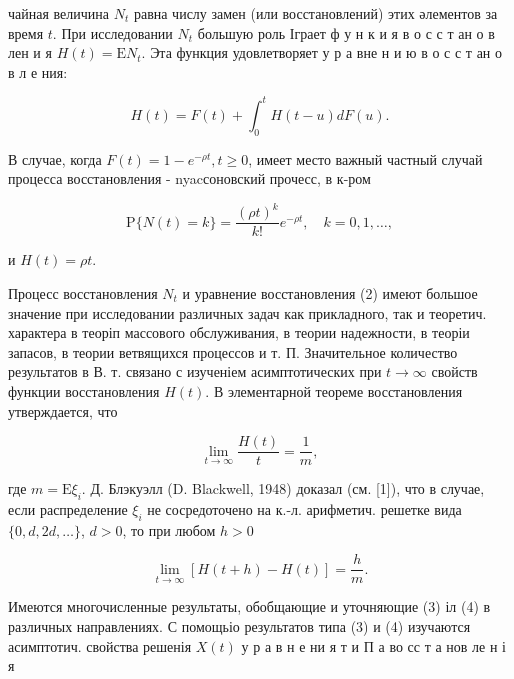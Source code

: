 \documentclass[10pt]{article}
\begin{document}
чайная величина $N_{t}$ равна числу замен (или восстановлений) этих әлементов за время $t$. При исследовании $N_{t}$ большую роль Іграет ф у н к и я в о с с т ан о в лен и я $H(t)=\mathrm{E} N_{t}$. Эта функция удовлетворяет у р а вне н и ю в о с с т ан о в л е ния:



\[

H(t)=F(t)+\int_{0}^{t} H(t-u) d F(u) .

\]



В случае, когда $F(t)=1-e^{-\rho t}, t \geqslant 0$, имеет место важный частный случай процесса восстановления - nyacсоновский прочесс, в к-ром



\[

\mathrm{P}\{N(t)=k\}=\frac{(\rho t)^{k}}{k !} e^{-\rho t}, \quad k=0,1, \ldots,

\]



и $H(t)=\rho t$.



Процесс восстановления $N_{t}$ и уравнение восстановления (2) имеют большое значение при исследовании различных задач как прикладного, так и теоретич. характера в теоріп массового обслуживания, в теории надежности, в теоріи запасов, в теории ветвящихся процессов и т. П. Значительное количество результатов в В. т. связано с изученіем асимптотических при $t \rightarrow \infty$ свойств функции восстановления $H(t)$. В элементарной теореме восстановления утверждается, что



\[

\lim _{t \rightarrow \infty} \frac{H(t)}{t}=\frac{1}{m},

\]



где $m=\mathrm{E} \xi_{i}$. Д. Блэкуэлл (D. Blackwell, 1948) доказал (см. [1]), что в случае, если распределение $\xi_{i}$ не сосредоточено на к.-л. арифметич. решетке вида $\{0, d, 2 d, \ldots\}$, $d>0$, то при любом $h>0$



\[

\lim _{t \rightarrow \infty}[H(t+h)-H(t)]=\frac{h}{m} .

\]



Имеются многочисленные результаты, обобщающие и уточняющие (3) іл (4) в различных направлениях. С помощьіо результатов типа (3) и (4) изучаются асимптотич. свойства решенія $X(t)$ у р а в н е ни я т и П а во сс т а нов ле н і я
\end{document}

